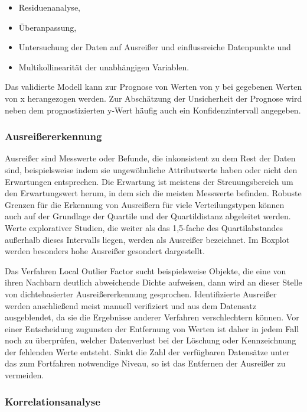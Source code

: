 \begin{itemize}
  \item Residuenanalyse,
  \item Überanpassung,
  \item Untersuchung der Daten auf Ausreißer und einflussreiche Datenpunkte und
  \item Multikollinearität der unabhängigen Variablen.
\end{itemize}	

\bigskip
Das validierte Modell kann zur Prognose von Werten von y bei gegebenen Werten von x herangezogen werden. Zur Abschätzung der Unsicherheit der Prognose wird neben dem prognostizierten y-Wert häufig auch ein Konfidenzintervall angegeben.


\subsubsection{Ausreißererkennung}

Ausreißer sind Messwerte oder Befunde, die inkonsistent zu dem Rest der Daten sind, beispielsweise indem sie ungewöhnliche Attributwerte haben oder nicht den Erwartungen entsprechen. Die Erwartung ist meistens der Streuungsbereich um den Erwartungswert herum, in dem sich die meisten Messwerte befinden. \glqq Robuste Grenzen für die Erkennung von Ausreißern für viele Verteilungstypen können auch auf der Grundlage der Quartile und der Quartildistanz abgeleitet werden.\grqq \cite{Sachs.2006} Werte explorativer Studien, die weiter als das 1,5-fache des Quartilabstandes außerhalb dieses Intervalls liegen, werden als Ausreißer bezeichnet. Im Boxplot werden besonders hohe Ausreißer gesondert dargestellt.

Das Verfahren Local Outlier Factor sucht beispielsweise Objekte, die eine von ihren Nachbarn deutlich abweichende Dichte aufweisen, dann wird an dieser Stelle von dichtebasierter Ausreißererkennung gesprochen. Identifizierte Ausreißer werden anschließend meist manuell verifiziert und aus dem Datensatz ausgeblendet, da sie die Ergebnisse anderer Verfahren verschlechtern können. Vor einer Entscheidung zugunsten der Entfernung von Werten ist daher in jedem Fall noch zu überprüfen, welcher Datenverlust bei der Löschung oder Kennzeichnung der fehlenden Werte entsteht. Sinkt die Zahl der verfügbaren Datensätze unter das zum Fortfahren notwendige Niveau, so ist das Entfernen der Ausreißer zu vermeiden.
	
\subsubsection{Korrelationsanalyse}

